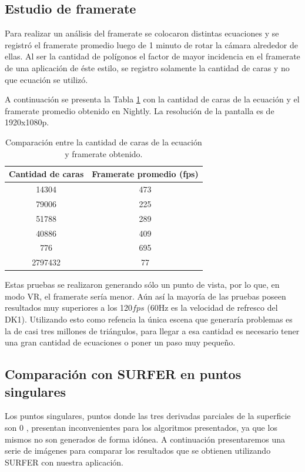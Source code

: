\documentclass[12pt]{article}
\begin{document}
\subsection{ Estudio de framerate}
\noindent Para realizar un análisis del framerate se colocaron distintas ecuaciones y se registró el framerate promedio luego de 1 minuto de rotar la cámara alrededor de ellas. Al ser la cantidad de polígonos  el factor de mayor incidencia en el framerate de una aplicación de éste estilo, se registro solamente la cantidad de caras y no que ecuación se utilizó.

A continuación se presenta la Tabla \ref{fps} con la cantidad de caras de la ecuación y el framerate promedio obtenido en Nightly. La resolución de la pantalla es de 1920x1080p.

\begin{table}[h!]
  \centering
  \label{tab:table1}
  \begin{tabular}{cc}
    \toprule
    Cantidad de caras & Framerate promedio (fps)\\
    \midrule
    14304 & 473\\
    79006 & 225\\
    51788 & 289\\
    40886&409\\
    776&695\\
    2797432&77\\
    \bottomrule
  \end{tabular}
  \caption{Comparación entre la cantidad de caras de la ecuación y framerate obtenido.}
\label{fps}
\end{table}

Estas pruebas se realizaron generando sólo un punto de vista, por lo que, en modo VR, el framerate sería menor. Aún así la mayoría de las pruebas poseen resultados muy superiores a los 120$fps$ (60Hz es la velocidad de refresco del DK1). Utilizando esto como refencia la única escena que generaría problemas es la de casi tres millones de triángulos, para llegar a esa cantidad es necesario tener una gran cantidad de ecuaciones o poner un paso muy pequeño.

\subsection{Comparación con SURFER en puntos singulares}
\noindent Los puntos singulares, puntos donde las tres derivadas parciales de la superficie son 0 \cite{implicitas}, presentan inconvenientes para los algoritmos presentados, ya que los mismos no son generados de forma idónea. A continuación presentaremos una serie de imágenes para comparar los resultados que se obtienen utilizando SURFER con nuestra aplicación. 
\end{document}

